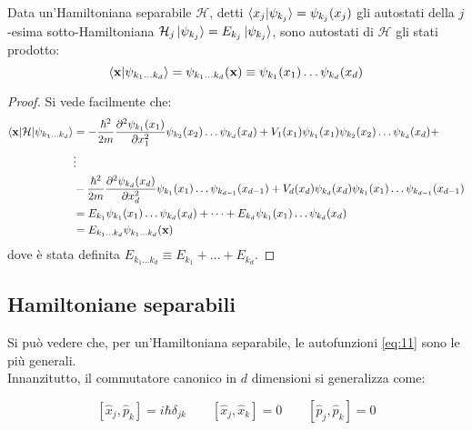 \begin{proposition}\label{ham-sep-cart}
	Data un'Hamiltoniana separabile $ \mathcal{H} $, detti $ \braket{x_j | \psi_{k_j}} = \psi_{k_j}(x_j) $ gli autostati della $ j $-esima sotto-Hamiltoniana $ \mathcal{H}_j \ket{\psi_{k_j}} = E_{k_j} \ket{\psi_{k_j}} $, sono autostati di $ \mathcal{H} $ gli stati prodotto:
	\begin{equation}
		\braket{\mathbf{x} | \psi_{k_1 \dots k_d}} = \psi_{k_1 \dots k_d} (\mathbf{x}) \equiv \psi_{k_1}(x_1) \dots \psi_{k_d}(x_d)
		\label{eq:11}
	\end{equation}
\end{proposition}
\begin{proof}
	Si vede facilmente che:
	\begin{equation*}
		\begin{split}
			\braket{\mathbf{x} | \mathcal{H} | \psi_{k_1 \dots k_d}}
			&= - \frac{\hbar^2}{2m} \frac{\partial^2 \psi_{k_1}(x_1)}{\partial x_1^2} \psi_{k_2}(x_2) \dots \psi_{k_d} (x_d) + V_1(x_1) \psi_{k_1}(x_1) \psi_{k_2}(x_2) \dots \psi_{k_d}(x_d) +\\
			& \vdots\\
			& - \frac{\hbar^2}{2m} \frac{\partial^2 \psi_{k_d}(x_d)}{\partial x_d^2} \psi_{k_1}(x_1) \dots \psi_{k_{d-1}} (x_{d-1}) + V_d(x_d) \psi_{k_d}(x_d) \psi_{k_1}(x_1) \dots \psi_{k_{d-1}}(x_{d-1})\\
			&= E_{k_1} \psi_{k_1}(x_1) \dots \psi_{k_d}(x_d) + \dots + E_{k_d} \psi_{k_1}(x_1) \dots \psi_{k_d}(x_d)\\
			&= E_{k_1 \dots k_d} \psi_{k_1 \dots k_d}(\mathbf{x})
		\end{split}
	\end{equation*}
	dove è stata definita $ E_{k_1 \dots k_d} \equiv E_{k_1} + \dots + E_{k_d} $.
\end{proof}

\subsection{Hamiltoniane separabili}

Si può vedere che, per un'Hamiltoniana separabile, le autofunzioni \ref{eq:11} sono le più generali.\\
Innanzitutto, il commutatore canonico in $ d $ dimensioni si generalizza come:

\begin{equation}
	\left[\hat{x}_j, \hat{p}_k\right] = i\hbar \delta_{jk} \qquad \left[\hat{x}_j, \hat{x}_k\right] = 0 \qquad \left[\hat{p}_j, \hat{p}_k\right] = 0
	\label{eq:12}
\end{equation}


